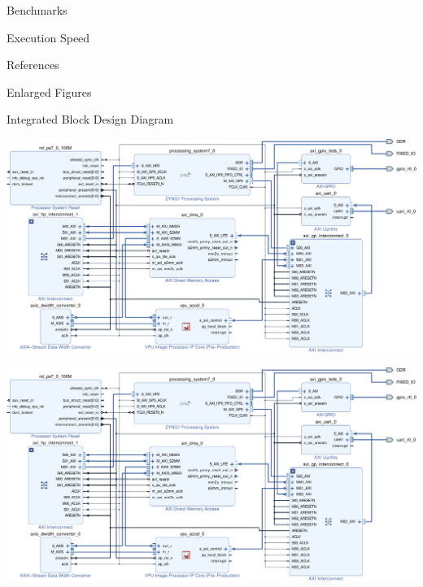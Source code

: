 \documentclass{matthijs}
\begin{document}
\begin{hoofdstuk}{Benchmarks}
\begin{paragraaf}{Execution Speed}
		\end{paragraaf}

	\end{hoofdstuk}
	
	\begin{hoofdstuk}{References}

		\printbibliography[heading=none]

	\end{hoofdstuk}

	\begin{appendices}
		\begin{hoofdstuk}{Enlarged Figures}
			\begin{paragraaf}{Integrated Block Design Diagram}
				\vspace{1cm}

			

				\centerline{\includegraphics[angle=90, origin=c, clip, trim=12.90cm 0 0 0, width=1.25\textwidth]{hw-block-diagram-v2-crop-asset.pdf}}
				\clearpage
				\centerline{\includegraphics[angle=90, origin=c, clip, trim=0 0 16.60cm 0, width=1.25\textwidth]{hw-block-diagram-v2-crop-asset.pdf}}


\end{paragraaf}
\end{hoofdstuk}
\end{appendices}
\end{document}
